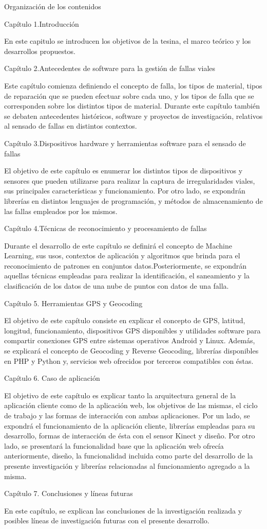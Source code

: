 Organización de los contenidos


Capítulo 1.Introducción


En este capitulo se introducen los objetivos de la tesina, el marco teórico y los desarrollos propuestos.

Capítulo 2.Antecedentes de software para la gestión de fallas viales

Este capítulo comienza definiendo el concepto de falla, los tipos de material, tipos de reparación que se pueden efectuar sobre cada uno, y los tipos de falla que se corresponden sobre los distintos tipos de material. Durante este capítulo también se debaten antecedentes históricos, software y proyectos de investigación, relativos al sensado de fallas en distintos contextos.

Capítulo 3.Dispositivos hardware y herramientas software para el sensado de fallas

El objetivo de este capítulo es enumerar los distintos tipos de dispositivos y sensores que pueden utilizarse para realizar la captura de irregularidades viales, sus principales características y funcionamiento. 
Por otro lado, se expondrán librerías en distintos lenguajes de programación, y métodos de almacenamiento de las fallas empleados por los mismos.

Capítulo 4.Técnicas de reconocimiento y procesamiento de fallas

Durante el desarrollo de este capítulo se definirá el concepto de Machine Learning, sus usos, contextos de aplicación y algoritmos que brinda para el reconocimiento de patrones en conjuntos datos.Posteriormente, se expondrán aquellas técnicas empleadas para realizar la identificación, el saneamiento y la clasificación de los datos de una nube de puntos con datos de una falla.

Capítulo 5. Herramientas GPS y Geocoding

El objetivo de este capítulo consiste en explicar el concepto de GPS, latitud, longitud, funcionamiento, dispositivos GPS disponibles y utilidades software para compartir conexiones GPS entre sistemas operativos Android y Linux.
Además, se explicará el concepto de Geocoding y Reverse Geocoding, librerías disponibles en PHP y Python y, servicios web ofrecidos por terceros compatibles con éstas.

Capítulo 6. Caso de aplicación

El objetivo de este capítulo es explicar tanto la arquitectura general de la aplicación cliente como de la aplicación web, los objetivos de las mismas, el ciclo de trabajo y las formas de interacción con ambas aplicaciones. 
Por un lado, se expondrá el funcionamiento de la aplicación cliente, librerías empleadas para su desarrollo, formas de interacción de ésta con el sensor Kinect y diseño.
Por otro lado, se presentará la funcionalidad base que la aplicación web ofrecía anteriormente, diseño, la funcionalidad incluida como parte del desarrollo de la presente investigación y librerías relacionadas al funcionamiento agregado a la misma. 

Capítulo 7. Conclusiones y líneas futuras

En este capítulo, se explican las conclusiones de la investigación realizada y posibles líneas de investigación futuras con el presente desarrollo.